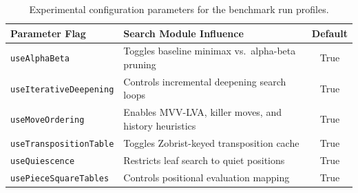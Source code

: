 \begin{table}[htbp]
\centering
\caption[Experimental Configuration Parameters]{Experimental configuration parameters for the benchmark run profiles.}
\label{tab:experimental_configs}
\begin{tabularx}{\textwidth}{lXc}
\toprule
\textbf{Parameter Flag} & \textbf{Search Module Influence} & \textbf{Default} \\
\midrule
\texttt{useAlphaBeta} & Toggles baseline minimax vs.\ alpha-beta pruning & True \\
\texttt{useIterativeDeepening} & Controls incremental deepening search loops & True \\
\texttt{useMoveOrdering} & Enables MVV-LVA, killer moves, and history heuristics & True \\
\texttt{useTranspositionTable} & Toggles Zobrist-keyed transposition cache & True \\
\texttt{useQuiescence} & Restricts leaf search to quiet positions & True \\
\texttt{usePieceSquareTables} & Controls positional evaluation mapping & True \\
\bottomrule
\end{tabularx}
\end{table}
